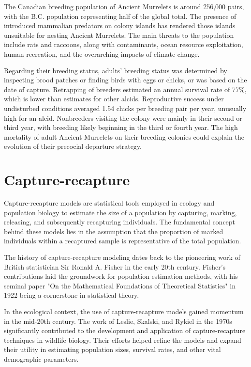 \documentclass{article}
\begin{document}
The Canadian breeding population of Ancient Murrelets is around 256,000 pairs, with the B.C. population representing half of the global total. The presence of introduced mammalian predators on colony islands has rendered those islands unsuitable for nesting Ancient Murrelets. The main threats to the population include rats and raccoons, along with contaminants, ocean resource exploitation, human recreation, and the overarching impacts of climate change.\cite{gaston1990population}


Regarding their breeding status, adults' breeding status was determined by inspecting brood patches or finding birds with eggs or chicks, or was based on the date of capture. Retrapping of breeders estimated an annual survival rate of 77\%, which is lower than estimates for other alcids. Reproductive success under undisturbed conditions averaged 1.54 chicks per breeding pair per year, unusually high for an alcid. Nonbreeders visiting the colony were mainly in their second or third year, with breeding likely beginning in the third or fourth year. The high mortality of adult Ancient Murrelets on their breeding colonies could explain the evolution of their precocial departure strategy.\cite{gaston1990population}



\section{Capture-recapture}

Capture-recapture models are statistical tools employed in ecology and population biology to estimate the size of a population by capturing, marking, releasing, and subsequently recapturing individuals. The fundamental concept behind these models lies in the assumption that the proportion of marked individuals within a recaptured sample is representative of the total population.

The history of capture-recapture modeling dates back to the pioneering work of British statistician Sir Ronald A. Fisher in the early 20th century. Fisher's contributions laid the groundwork for population estimation methods, with his seminal paper "On the Mathematical Foundations of Theoretical Statistics" in 1922 being a cornerstone in statistical theory.

In the ecological context, the use of capture-recapture models gained momentum in the mid-20th century. The work of Leslie, Skalski, and Rykiel in the 1970s significantly contributed to the development and application of capture-recapture techniques in wildlife biology. Their efforts helped refine the models and expand their utility in estimating population sizes, survival rates, and other vital demographic parameters.
\end{document}
